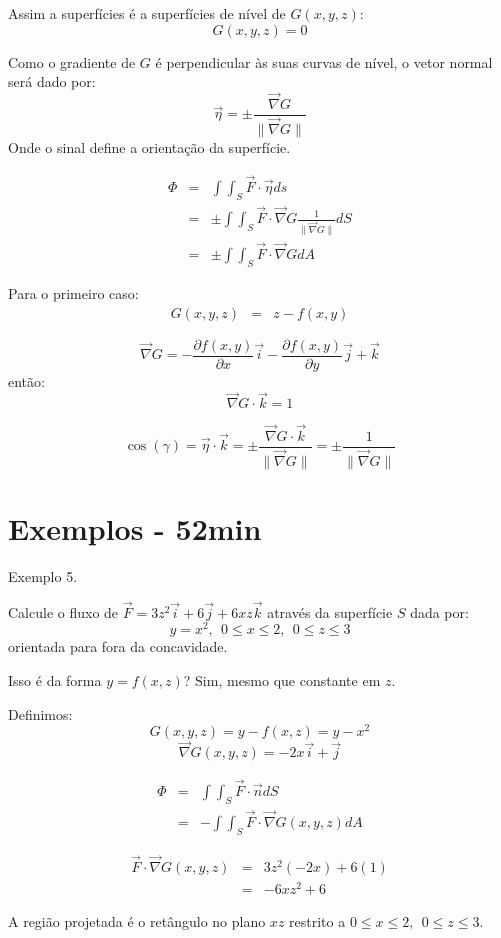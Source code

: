 \documentclass[a4paper,10pt]{book}
\begin{document}
Assim a superfícies é a superfícies de nível de $G(x,y,z)$:
$$G(x,y,z)=0$$

Como o gradiente de $G$ é perpendicular às suas curvas de nível, o vetor normal será dado por:
$$\vec{\eta} = \pm \frac{\vec{\nabla}G}{\|\vec{\nabla}G \|}$$
Onde o sinal define a orientação da superfície.


\begin{eqnarray*}
\Phi &=&  \int\int_S\vec{F}\cdot\vec{\eta}ds\\
&=&\pm\int\int_S\vec{F}\cdot\vec{\nabla }G\frac{1}{\|\vec{\nabla }G\|}dS\\
&=&\pm\int\int_S\vec{F}\cdot\vec{\nabla }GdA
\end{eqnarray*}

Para o primeiro caso:
\begin{eqnarray*}
 G(x,y,z)&=&z-f(x,y)  
 \end{eqnarray*}

$$\vec{\nabla}G =-\frac{\partial f(x,y)}{\partial x}\vec{i}-\frac{\partial f(x,y)}{\partial y}\vec{j}+\vec{k}$$
então:
$$\vec{\nabla}G \cdot \vec{k}= 1$$

$$\cos(\gamma)=\vec{\eta}\cdot\vec{k} = \pm \frac{\vec{\nabla}G\cdot\vec{k}}{\|\vec{\nabla}G \|}=\pm \frac{1}{\|\vec{\nabla}G \|}$$


\section{Exemplos - 52min}
Exemplo 5. 

 Calcule o fluxo de $\vec{F}=3z^2\vec{i}+6\vec{j}+ 6xz\vec{k}$ através da superfície $S$ dada por:
 $$y=x^2,~~ 0\leq x \leq 2,~~0\leq z \leq 3$$
 orientada para fora da concavidade.

 Isso é da forma $y=f(x,z)$? Sim, mesmo que constante em $z$.
 
 Definimos:
 $$G(x,y,z)=y-f(x,z)=y-x^2$$
$$\vec{\nabla}G(x,y,z)=-2x\vec{i}+\vec{j} $$

\begin{eqnarray*}
\Phi&=&\int\int_S\vec{F}\cdot \vec{n}dS\\&=&-\int\int_S\vec{F}\cdot \vec{\nabla}G(x,y,z)dA 
\end{eqnarray*}

\begin{eqnarray*}
\vec{F}\cdot \vec{\nabla}G(x,y,z)&=&3z^2(-2x)+6(1)\\
&=&-6xz^2+6
\end{eqnarray*}

A região projetada é o retângulo no plano $xz$ restrito a $0\leq x \leq 2,~~0\leq z \leq 3$.
\end{document}

